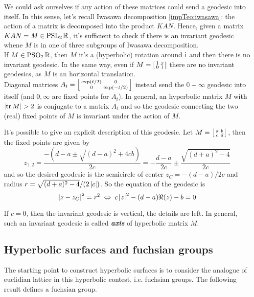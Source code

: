 We could ask ourselves if any action of these matrices could send a geodesic into itself. In this sense, let's recall Iwasawa decomposition \ref{impTeo:iwasawa}: the action of a matrix is decomposed into the product $KAN$. Hence, given a matrix $KAN=M\in\operatorname{PSL}_{2}\mathbb{R}$, it's sufficient to check if there is an invariant geodesic whene $M$ is in one of three subgroups of Iwasawa decomposition.\\
If $M\in\operatorname{PSO}_{2}\mathbb{R}$, then $M$ it's a (hyperbolic) rotation around $\mathrm{i}$ and then there is no invariant geodesic. In the same way, even if $M=\left[\begin{smallmatrix} 1&x\\0&1 \end{smallmatrix}\right]$ there are no invariant geodesics, as $M$ is an horizontal translation.\\
Diagonal matrices $A_{t}=\left[\begin{smallmatrix} \exp(t/2)&0\\0&\exp(-t/2) \end{smallmatrix}\right]$ instead send the $0-\infty$ geodesic into itself (and $0,\infty$ are fixed points for $A_{t}$). In general, an hyperbolic matrix $M$ with $\abs{\tr M}>2$ is conjugate to a matrix $A_{t}$ and so the geodesic connecting the two (real) fixed points of $M$ is invariant under the action of $M$.

It's possible to give an explicit description of this geodesic. Let $M=\left[\begin{smallmatrix} a&b\\c&d \end{smallmatrix}\right]$, then the fixed points are given by
\[
z_{1,2}=\frac{-(d-a\pm\sqrt{(d-a)^{2}+4cb})}{2c}=-\frac{d-a}{2c}\pm\frac{\sqrt{(d+a)^{2}-4}}{2c}
\]
and so the desired geodesic is the semicircle of center $z_{C}=-(d-a)/2c$ and radius $r=\sqrt{(d+a)^{2}-4}/(2\left| c\right|)$. So the equation of the geodesic is 
\begin{equation}
\label{eq:invar_geodes_hyperb}
\left| z-z_{C}\right|^{2}=r^{2}\;\Leftrightarrow\;c\left| z\right|^{2}-(d-a)\Re(z)-b=0
\end{equation}

If $c=0$, then the invariant geodesic is vertical, the details are left. In general, such an invariant geodesic is called \emph{\textbf{axis}} of hyperbolic matrix $M$.




\subsection{Hyperbolic surfaces and fuchsian groups}

\label{subsec:hyp_surfc}

The starting point to construct hyperbolic surfaces is to consider the analogue of euclidian lattice in this hyperbolic contest, i.e. fuchsian groups. The following result defines a fuchsian group.

